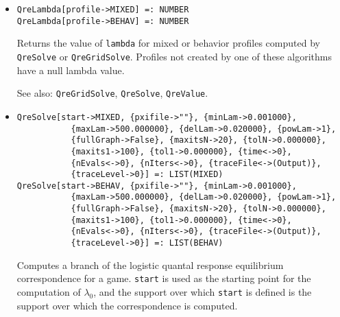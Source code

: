 \begin{itemize}
\item{}
\protect \large \begin{verbatim}
QreLambda[profile->MIXED] =: NUMBER 
QreLambda[profile->BEHAV] =: NUMBER 
\end{verbatim}\normalsize

\bd
Returns the value of \verb+lambda+ for mixed or behavior profiles
computed by \verb+QreSolve+ or \verb+QreGridSolve+.  Profiles not
created by one of these algorithms have a null lambda value.
\item
[See also:] \verb+QreGridSolve+, \verb+QreSolve+, \verb+QreValue+.
\ed

\item{}
\protect \large \begin{verbatim}
QreSolve[start->MIXED, {pxifile->""}, {minLam->0.001000}, 
           {maxLam->500.000000}, {delLam->0.020000}, {powLam->1}, 
           {fullGraph->False}, {maxitsN->20}, {tolN->0.000000}, 
           {maxits1->100}, {tol1->0.000000}, {time<->0}, 
           {nEvals<->0}, {nIters<->0}, {traceFile<->(Output)}, 
           {traceLevel->0}] =: LIST(MIXED) 
QreSolve[start->BEHAV, {pxifile->""}, {minLam->0.001000}, 
           {maxLam->500.000000}, {delLam->0.020000}, {powLam->1}, 
           {fullGraph->False}, {maxitsN->20}, {tolN->0.000000}, 
           {maxits1->100}, {tol1->0.000000}, {time<->0}, 
           {nEvals<->0}, {nIters<->0}, {traceFile<->(Output)}, 
           {traceLevel->0}] =: LIST(BEHAV) 
\end{verbatim}\normalsize

\bd 
Computes a branch of the logistic quantal response equilibrium
correspondence for a game. \verb+start+ is
used as the starting point for the computation of $\lambda_{0}$, and
the support over which \verb+start+ is defined is the support over
which the correspondence is computed.


\end{itemize}
